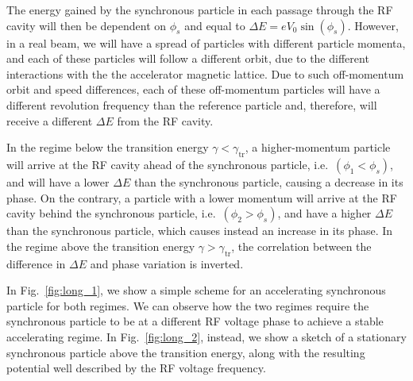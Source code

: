 The energy gained by the synchronous particle in each passage through the RF cavity will then be dependent on $\phi_s$ and equal to $\Delta E=e V_0 \sin \left(\phi_s\right)$. However, in a real beam, we will have a spread of particles with different particle momenta, and each of these particles will follow a different orbit, due to the different interactions with the the accelerator magnetic lattice. Due to such off-momentum orbit and speed differences, each of these off-momentum particles will have a different revolution frequency than the reference particle and, therefore, will receive a different $\Delta E$ from the RF cavity.

In the regime below the transition energy $\gamma < \gamma_\text{tr}$, a higher-momentum particle will arrive at the RF cavity ahead of the synchronous particle, i.e.\ $\left(\phi_1<\phi_s\right)$, and will have a lower $\Delta E$ than the synchronous particle, causing a decrease in its phase. On the contrary, a particle with a lower momentum will arrive at the RF cavity behind the synchronous particle, i.e.\ $\left(\phi_2>\phi_s\right)$, and have a higher $\Delta E$ than the synchronous particle, which causes instead an increase in its phase. In the regime above the transition energy $\gamma > \gamma_\text{tr}$, the correlation between the difference in $\Delta E$ and phase variation is inverted.

In Fig.~\ref{fig:long_1}, we show a simple scheme for an accelerating synchronous particle for both regimes. We can observe how the two regimes require the synchronous particle to be at a different RF voltage phase to achieve a stable accelerating regime. In Fig.~\ref{fig:long_2}, instead, we show a sketch of a stationary synchronous particle above the transition energy, along with the resulting potential well described by the RF voltage frequency.

